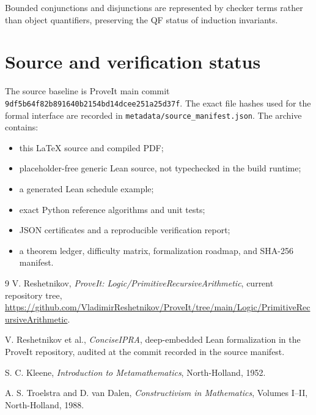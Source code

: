 \documentclass[11pt]{article}
\begin{document}
Bounded conjunctions and disjunctions are represented by checker terms rather
than object quantifiers, preserving the QF status of induction invariants.

\section{Source and verification status}

The source baseline is ProveIt main commit
\texttt{9df5b64f82b891640b2154bd14dcee251a25d37f}.  The exact file hashes used for
the formal interface are recorded in
\texttt{metadata/source\_manifest.json}.  The archive contains:

\begin{itemize}
\item this LaTeX source and compiled PDF;
\item placeholder-free generic Lean source, not typechecked in the build
      runtime;
\item a generated Lean schedule example;
\item exact Python reference algorithms and unit tests;
\item JSON certificates and a reproducible verification report;
\item a theorem ledger, difficulty matrix, formalization roadmap, and SHA-256
      manifest.
\end{itemize}

\begin{thebibliography}{9}
V. Reshetnikov,
\emph{ProveIt: Logic/PrimitiveRecursiveArithmetic}, current repository tree,
\url{https://github.com/VladimirReshetnikov/ProveIt/tree/main/Logic/PrimitiveRecursiveArithmetic}.

V. Reshetnikov et al.,
\emph{ConciseIPRA}, deep-embedded Lean formalization in the ProveIt repository,
audited at the commit recorded in the source manifest.

S. C. Kleene,
\emph{Introduction to Metamathematics},
North-Holland, 1952.

A. S. Troelstra and D. van Dalen,
\emph{Constructivism in Mathematics}, Volumes I--II,
North-Holland, 1988.
\end{thebibliography}
\end{document}
